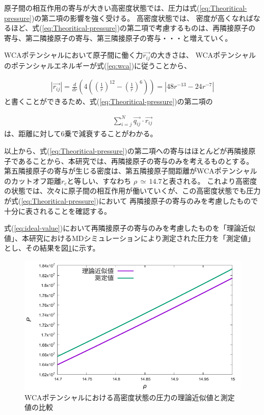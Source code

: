 \documentclass[titlepage]{jsreport}
\begin{document}
{{{原子間の相互作用の寄与が大きい高密度状態では、圧力は式(\ref{eq:Theoritical-pressure})の第二項の影響を強く受ける。
高密度状態では、
密度が高くなればなるほど、式(\ref{eq:Theoritical-pressure})の第二項で考慮するものは、再隣接原子の寄与、第二隣接原子の寄与、第三隣接原子の寄与・・・と増えていく。

WCAポテンシャルにおいて原子間に働く力$\vec{r_{ij}}$の大きさは、
WCAポテンシャルのポテンシャルエネルギーが式(\ref{eq:wca})に従うことから、

\large
\begin{eqnarray}
    | {\vec{r_{ij}}} |=\frac{d}{dr}\left(4\left(\left(\frac{1}{r}\right)^{12}-\left(\frac{1}{r}\right)^6\right)\right)=| 48r^{-13}-24r^{-7}| \nonumber
\end{eqnarray}
\normalsize
と書くことができるため、式(\ref{eq:Theoritical-pressure})の第二項の

\large
\begin{eqnarray}
    \sum_{i=j}^N\vec{q_{ij}} \cdot \vec{r_{ij}} \nonumber
\end{eqnarray}
\normalsize
は、距離に対して6乗で減衰することがわかる。

以上から、式(\ref{eq:Theoritical-pressure})の第二項への寄与はほとんどが再隣接原子であることから、本研究では、再隣接原子の寄与のみを考えるものとする。
第五隣接原子の寄与が生じる密度は、第五隣接原子間距離がWCAポテンシャルのカットオフ距離$r_c$と等しい、すなわち
$\rho\,{\simeq}\,14.7$と表される。
これより高密度の状態では、次々に原子間の相互作用が働いていくが、この高密度状態でも圧力が式(\ref{eq:Theoritical-pressure})において
再隣接原子の寄与のみを考慮したもので十分に表されることを確認する。

式(\ref{eq:ideal-value})において再隣接原子の寄与のみを考慮したものを「理論近似値」、本研究におけるMDシミュレーションにより測定された圧力を「測定値」とし、その結果を図\ref{fig:highden_compare:den-pre}に示す。

\begin{figure}[htbp]
    \begin{center}
        \includegraphics[width=14cm]{fig/highden_compare:den-pre.pdf}
    \end{center}
    \caption{WCAポテンシャルにおける高密度状態の圧力の理論近似値と測定値の比較}
    \label{fig:highden_compare:den-pre}
\end{figure}

}}}
\end{document}
